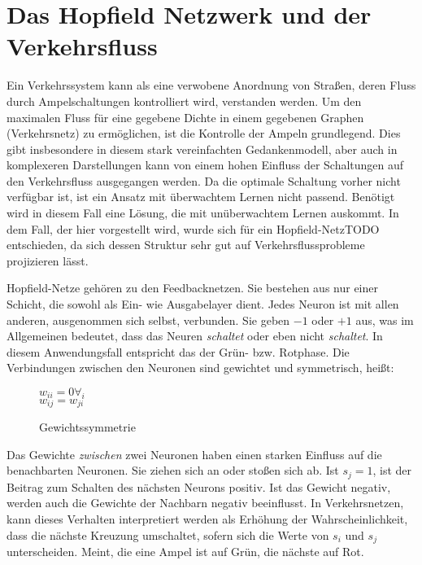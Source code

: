 \section{Das Hopfield Netzwerk und der Verkehrsfluss}

Ein Verkehrssystem kann als eine verwobene Anordnung von Straßen, deren Fluss durch Ampelschaltungen kontrolliert wird, verstanden werden. Um den maximalen Fluss für eine gegebene Dichte in einem gegebenen Graphen (Verkehrsnetz) zu ermöglichen, ist die Kontrolle der Ampeln grundlegend. Dies gibt insbesondere in diesem stark vereinfachten Gedankenmodell, aber auch in komplexeren Darstellungen kann von einem hohen Einfluss der Schaltungen auf den Verkehrsfluss ausgegangen werden.
Da die optimale Schaltung vorher nicht verfügbar ist, ist ein Ansatz mit überwachtem Lernen nicht passend. Benötigt wird in diesem Fall eine Lösung, die mit unüberwachtem Lernen auskommt. In dem Fall, der hier vorgestellt wird, wurde sich für ein Hopfield-NetzTODO entschieden, da sich dessen Struktur sehr gut auf Verkehrsflussprobleme projizieren lässt.

Hopfield-Netze gehören zu den Feedbacknetzen. Sie bestehen aus nur einer Schicht, die sowohl als Ein- wie Ausgabelayer dient. Jedes Neuron ist mit allen anderen, ausgenommen sich selbst, verbunden. Sie geben \(-1\) oder \(+1\) aus, was im Allgemeinen bedeutet, dass das Neuren \textit{schaltet} oder eben nicht \textit{schaltet}. In diesem Anwendungsfall entspricht das der Grün- bzw. Rotphase.
Die Verbindungen zwischen den Neuronen sind gewichtet und symmetrisch, heißt:

\begin{figure}[H]
    \( w_{ii} = 0 \forall_i \)\\
    \( w_{ij} = w_{ji} \)\\
    \caption{Gewichtssymmetrie}
    \label{func:weight_symmetry}
\end{figure}

Das Gewichte \textit{zwischen} zwei Neuronen haben einen starken Einfluss auf die benachbarten Neuronen. Sie ziehen sich an oder stoßen sich ab. Ist \(s_j = 1\), ist der Beitrag zum Schalten des nächsten Neurons positiv. Ist das Gewicht negativ, werden auch die Gewichte der Nachbarn negativ beeinflusst. In Verkehrsnetzen, kann dieses Verhalten interpretiert werden als Erhöhung der Wahrscheinlichkeit, dass die nächste Kreuzung umschaltet, sofern sich die Werte von \(s_i\) und \(s_j\) unterscheiden. Meint, die eine Ampel ist auf Grün, die nächste auf Rot.

